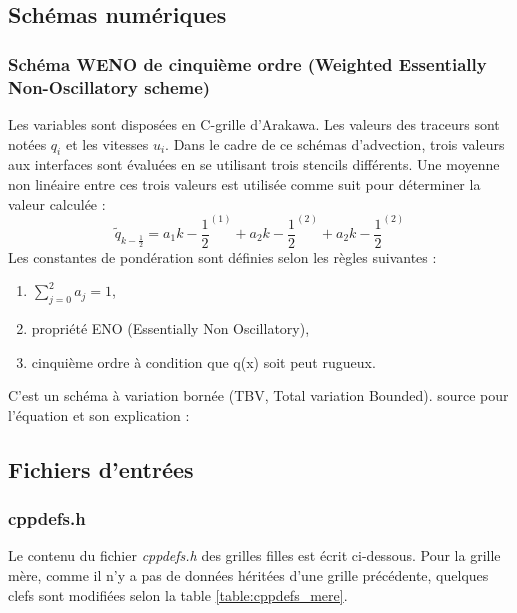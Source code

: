 \documentclass[10pt,a4paper,titlepage]{article}
\begin{document}
    
    \subsection{Schémas numériques}
    \subsubsection{Schéma WENO de cinquième ordre (Weighted Essentially Non-Oscillatory scheme)}\label{anx:WENO}
    Les variables sont disposées en C-grille d'Arakawa.
    Les valeurs des traceurs sont notées $q_i$ et les vitesses $u_i$.
    Dans le cadre de ce schémas d'advection, trois valeurs aux interfaces sont évaluées en se utilisant trois stencils différents. Une moyenne non linéaire entre ces trois valeurs est utilisée comme suit pour déterminer la valeur calculée :
    $$\tilde{q}_{k-\frac{1}{2}} = a_1k-\frac{1}{2}^{(1)} + a_2k-\frac{1}{2}^{(2)} + a_2k-\frac{1}{2}^{(2)}$$
    Les constantes de pondération sont définies selon les règles suivantes :
    \begin{enumerate}
        \item $\sum_{j=0}^{2}a_j = 1$,
        \item propriété ENO (Essentially Non Oscillatory),
        \item cinquième ordre à condition que q(x) soit peut rugueux.
    \end{enumerate}
    C'est un schéma à variation bornée (TBV, Total variation Bounded).
    source pour l'équation et son explication : \cite{schemas_advection}
    
    
    \subsection{Fichiers d'entrées}
    \subsubsection{cppdefs.h}
    \label{anx:cppdefs}
    Le contenu du fichier \textit{cppdefs.h} des grilles filles est écrit ci-dessous. Pour la grille mère, comme il n'y a pas de données héritées d'une grille précédente, quelques clefs sont modifiées selon la table \ref{table:cppdefs_mere}.
    
\end{document}
